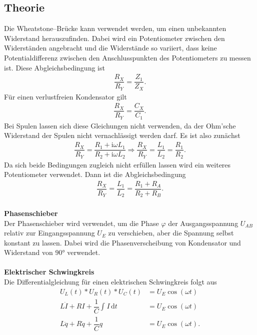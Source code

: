 \documentclass[a4paper,12pt]{article}
\newcommand{\td}{\,\text{d}}
\numberwithin{equation}{section}
\begin{document}
\subsection{Theorie}
Die Wheatstone--Brücke kann verwendet werden, um einen unbekannten Widerstand herauszufinden. Dabei wird ein Potentiometer zwischen den Widerständen angebracht und die Widerstände so variiert, dass keine Potentialdifferenz zwischen den Anschlusspunkten des Potentiometers zu messen ist. Diese Abgleichsbedingung ist
\begin{align} 
        \dfrac{R_X}{R_Y}=\dfrac{Z_1}{Z_X}
.\end{align} 
Für einen verlustfreien Kondensator gilt
\begin{align} 
        \dfrac{R_X}{R_Y}=\dfrac{C_X}{C_1}
.\end{align} 
Bei Spulen lassen sich diese Gleichungen nicht verwenden, da der Ohm'sche Widerstand der Spulen nicht vernachlässigt werden darf. Es ist also zunächst
\begin{align} 
        \dfrac{R_X}{R_Y}=\dfrac{R_1+\text{i}\omega L_1}{R_2+\text{i}\omega L_2}\Rightarrow \dfrac{R_X}{R_Y}=\dfrac{L_1}{L_2}=\dfrac{R_1}{R_2}
.\end{align} 
Da sich beide Bedingungen zugleich nicht erfüllen lassen wird ein weiteres Potentiometer verwendet. Dann ist die Abgleichsbedingung
\begin{align} 
        \dfrac{R_X}{R_Y}=\dfrac{L_1}{L_2}=\dfrac{R_1+R_A}{R_2+R_B}
.\end{align} 
\hfill\\\textbf{Phasenschieber}\\ 
Der Phasenschieber wird verwendet, um die Phase $\varphi $ der Ausgangsspannung $U_{AB}$ relativ zur Eingangsspannung $U_E$ zu verschieben, aber die Spannung selbst konstant zu lassen. Dabei wird die Phasenverscheibung von Kondensator und Widerstand von $\ang{90}$ verwendet.
\\\hfill\\\textbf{Elektrischer Schwingkreis}\\ 
Die Differentialgleichung für einen elektrischen Schwingkreis folgt aus
\begin{align} 
        U_L\left(t\right)*U_R\left(t\right)*U_C\left(t\right)&=U_E\cos \left(\omega t\right)\\
        L\dot{I}+RI+\dfrac{1}{C}\int_{}^{}I\td t&=U_E\cos \left(\omega t\right)\\
        L\ddot{q}+R\dot{q}+\dfrac{1}{C}q&=U_E\cos \left(\omega t\right)
.\end{align} 
\end{document}
